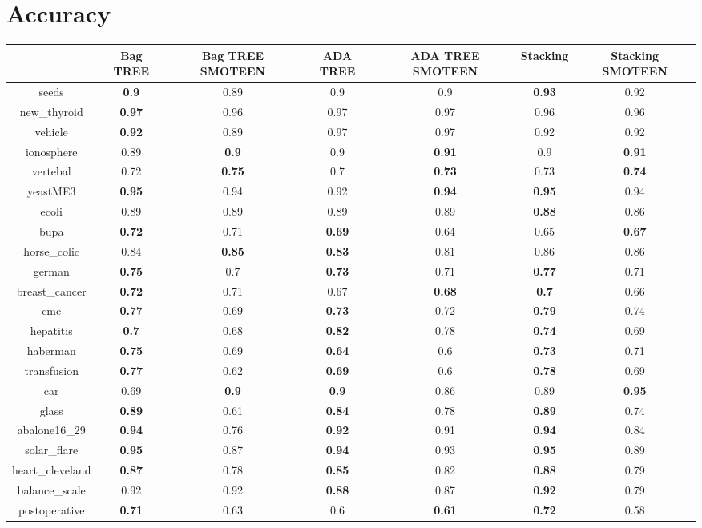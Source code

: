\documentclass{article}%
\begin{document}
%
\normalsize%
\section*{Accuracy}%
\begin{tabular}{c|cccccc}%
&Bag TREE&Bag TREE SMOTEEN&ADA TREE&ADA TREE SMOTEEN&Stacking&Stacking SMOTEEN\\%
\hline%
seeds&\textbf{0.9}&0.89&0.9&0.9&\textbf{0.93}&0.92\\%
new\_thyroid&\textbf{0.97}&0.96&0.97&0.97&0.96&0.96\\%
vehicle&\textbf{0.92}&0.89&0.97&0.97&0.92&0.92\\%
ionosphere&0.89&\textbf{0.9}&0.9&\textbf{0.91}&0.9&\textbf{0.91}\\%
vertebal&0.72&\textbf{0.75}&0.7&\textbf{0.73}&0.73&\textbf{0.74}\\%
yeastME3&\textbf{0.95}&0.94&0.92&\textbf{0.94}&\textbf{0.95}&0.94\\%
ecoli&0.89&0.89&0.89&0.89&\textbf{0.88}&0.86\\%
bupa&\textbf{0.72}&0.71&\textbf{0.69}&0.64&0.65&\textbf{0.67}\\%
horse\_colic&0.84&\textbf{0.85}&\textbf{0.83}&0.81&0.86&0.86\\%
german&\textbf{0.75}&0.7&\textbf{0.73}&0.71&\textbf{0.77}&0.71\\%
breast\_cancer&\textbf{0.72}&0.71&0.67&\textbf{0.68}&\textbf{0.7}&0.66\\%
cmc&\textbf{0.77}&0.69&\textbf{0.73}&0.72&\textbf{0.79}&0.74\\%
hepatitis&\textbf{0.7}&0.68&\textbf{0.82}&0.78&\textbf{0.74}&0.69\\%
haberman&\textbf{0.75}&0.69&\textbf{0.64}&0.6&\textbf{0.73}&0.71\\%
transfusion&\textbf{0.77}&0.62&\textbf{0.69}&0.6&\textbf{0.78}&0.69\\%
car&0.69&\textbf{0.9}&\textbf{0.9}&0.86&0.89&\textbf{0.95}\\%
glass&\textbf{0.89}&0.61&\textbf{0.84}&0.78&\textbf{0.89}&0.74\\%
abalone16\_29&\textbf{0.94}&0.76&\textbf{0.92}&0.91&\textbf{0.94}&0.84\\%
solar\_flare&\textbf{0.95}&0.87&\textbf{0.94}&0.93&\textbf{0.95}&0.89\\%
heart\_cleveland&\textbf{0.87}&0.78&\textbf{0.85}&0.82&\textbf{0.88}&0.79\\%
balance\_scale&0.92&0.92&\textbf{0.88}&0.87&\textbf{0.92}&0.79\\%
postoperative&\textbf{0.71}&0.63&0.6&\textbf{0.61}&\textbf{0.72}&0.58\\%
\end{tabular}
\end{document}
